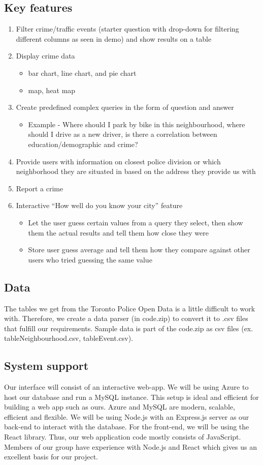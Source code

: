 \documentclass[12pt, a4paper]{article}
\begin{document}
\subsection*{Key features}
\begin{enumerate}
\item Filter crime/traffic events (starter question with drop-down for filtering different columns as seen in demo) and show results on a table
\item Display crime data
\begin{itemize}
\item bar chart, line chart, and pie chart
\item map, heat map
\end{itemize}
\item Create predefined complex queries in the form of question and answer
\begin{itemize}
    \item Example - Where should I park by bike in this neighbourhood, where should I drive as a new driver, is there a correlation between education/demographic and crime?
\end{itemize}
\item Provide users with information on closest police division or which neighborhood they are situated in based on the address they provide us with
\item Report a crime
\item Interactive “How well do you know your city” feature
\begin{itemize}
    \item Let the user guess certain values from a query they select, then show them the actual results and tell them how close they were
    \item Store user guess average and tell them how they compare against other users who tried guessing the same value
\end{itemize}
\end{enumerate}
\subsection*{Data}
The tables we get from the Toronto Police Open Data is a little difficult to work with. Therefore, we create a data parser (in code.zip) to convert it to .csv files that fulfill our requirements. Sample data is part of the code.zip as csv files (ex. tableNeighbourhood.csv, tableEvent.csv).
\subsection*{System support}
Our interface will consist of an interactive web-app. We will be using Azure to host our database and run a MySQL instance. This setup is ideal and efficient for building a web app such as ours. Azure and MySQL are modern, scalable, efficient and flexible. We will be using Node.js with an Express.js server as our back-end to interact with the database. For the front-end, we will be using the React library. Thus, our web application code mostly consists of JavaScript. Members of our group have experience with Node.js and React which gives us an excellent basis for our project.
\end{document}
